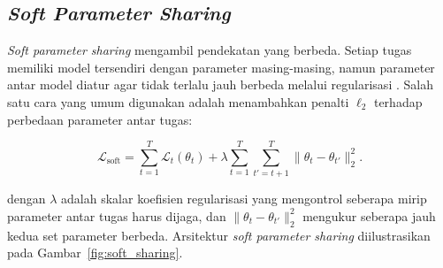 \subsection{\textit{Soft Parameter Sharing}}

\textit{Soft parameter sharing} mengambil pendekatan yang berbeda. Setiap
tugas memiliki model tersendiri dengan parameter masing-masing, namun
parameter antar model diatur agar tidak terlalu jauh berbeda melalui
regularisasi \parencite{ruder2017overview}. Salah satu cara yang umum
digunakan adalah menambahkan penalti $\ell_2$ terhadap perbedaan parameter
antar tugas:

\begin{equation}
    \mathcal{L}_{\text{soft}} = \sum_{t=1}^{T} \mathcal{L}_t(\theta_t)
    + \lambda \sum_{t=1}^{T} \sum_{t'=t+1}^{T}
    \|\theta_t - \theta_{t'}\|_2^2.
    \label{eq:soft_l2_reg}
\end{equation}

\noindent dengan $\lambda$ adalah skalar koefisien regularisasi yang mengontrol
seberapa mirip parameter antar tugas harus dijaga, dan
$\|\theta_t - \theta_{t'}\|_2^2$ mengukur seberapa jauh kedua set
parameter berbeda. Arsitektur \textit{soft parameter sharing}
diilustrasikan pada Gambar~\ref{fig:soft_sharing}.


